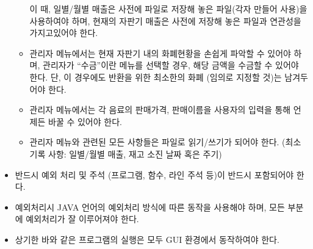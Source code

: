 \documentclass{oblivoir}
\begin{document}
\begin{itemize}
\begin{itemize}
            이 때, 일별/월별 매출은 사전에 파일로 저장해 놓은
            파일(각자 만들어 사용)을 사용하여야 하며,
            현재의 자판기 매출은 사전에 저장해 놓은 파일과
            연관성을 가지고있어야 한다.
            \item 관리자 메뉴에서는 현재 자판기 내의 화폐현황을
            손쉽게 파악할 수 있어야 하며,
            관리자가 “수금”이란 메뉴를 선택할 경우,
            해당 금액을 수금할 수 있어야 한다.
            단, 이 경우에도 반환을 위한 최소한의 화폐
            (임의로 지정할 것)는 남겨두어야 한다.
            \item 관리자 메뉴에서는 각 음료의 판매가격,
            판매이름을 사용자의 입력을 통해 언제든 바꿀 수 있어야 한다.
            \item 관리자 메뉴와 관련된 모든 사항들은 파일로
            읽기/쓰기가 되어야 한다.
            (최소 기록 사항: 일별/월별 매출, 재고 소진 날짜 혹은 주기)
        \end{itemize}
        \item 반드시 예외 처리 및 주석 (프로그램, 함수, 라인 주석 등)이
        반드시 포함되어야 한다.
        \item 예외처리시 JAVA 언어의 예외처리 방식에 따른 동작을 사용해야 하며,
        모든 부분에 예외처리가 잘 이루어져야 한다.
        \item 상기한 바와 같은 프로그램의 실행은 모두 GUI 환경에서 동작하여야 한다.
    \end{itemize}
\end{document}
